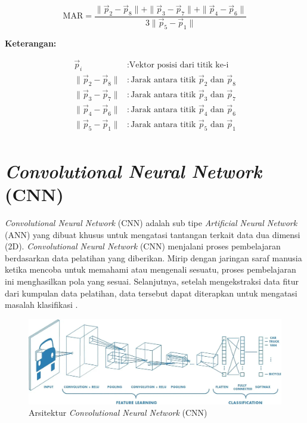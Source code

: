      \begin{equation}
    \label{rumus mar}
    \text{MAR} = \frac{\| \vec{p}_2 - \vec{p}_8 \| + \| \vec{p}_3 - \vec{p}_7 \| + \| \vec{p}_4 - \vec{p}_6 \| }{3 \| \vec{p}_5 - \vec{p}_1 \|}
\end{equation}


      \textbf{Keterangan:}
      
    \begin{align*}
        \vec{p}_i & : \text{Vektor posisi dari titik ke-i} \\
        \|\vec{p}_2 - \vec{p}_8\| & : \text{Jarak antara titik } \vec{p}_2 \text{ dan } \vec{p}_8 \\
        \|\vec{p}_3 - \vec{p}_7\| & : \text{Jarak antara titik } \vec{p}_3 \text{ dan } \vec{p}_7 \\
        \|\vec{p}_4 - \vec{p}_6\| & : \text{Jarak antara titik } \vec{p}_4 \text{ dan } \vec{p}_6 \\
        \|\vec{p}_5 - \vec{p}_1\| & : \text{Jarak antara titik } \vec{p}_5 \text{ dan } \vec{p}_1 \\
    \end{align*}



    

\section{\textit{Convolutional Neural Network} (CNN)}

    \textit{Convolutional Neural Network} (CNN) adalah sub tipe \textit{Artificial Neural Network} (ANN) yang
     dibuat khusus untuk mengatasi tantangan terkait data dua dimensi (2D). \textit{Convolutional Neural Network}
      (CNN) menjalani proses pembelajaran berdasarkan data pelatihan yang diberikan. Mirip dengan jaringan saraf
       manusia ketika mencoba untuk memahami atau mengenali sesuatu, proses pembelajaran ini menghasilkan pola
        yang sesuai. Selanjutnya, setelah mengekstraksi data fitur dari kumpulan data pelatihan, data tersebut
         dapat diterapkan untuk mengatasi masalah klasifikasi \cite{Alzubaidi2021}. 
    
  \begin{figure}[H]
      \centering
      \includegraphics[width=1\textwidth]{figures/bab2/arsitektur cnn.jpg}
      \caption[Arsitektur \textit{Convolutional Neural Network} (CNN)]{Arsitektur \textit{Convolutional Neural Network} (CNN) \cite{Prabhu}}
      \label{Arsitektur CNN}
    
    \end{figure}

